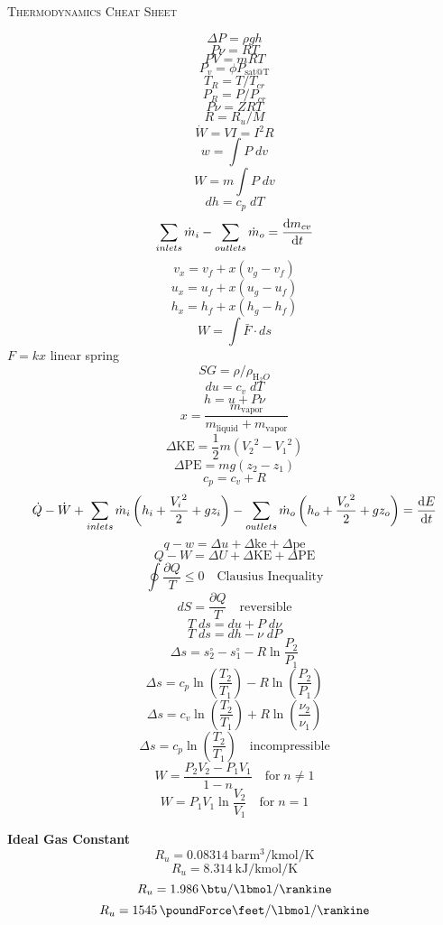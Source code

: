 \documentclass{article}
\begin{document}
\begin{center}
    \large\textsc{Thermodynamics Cheat Sheet} 
\end{center}

\begin{multicols}{2}
\[\Delta P = \rho gh\]
\[P \nu = R T\]
\[PV=mRT\]
\[P_v = \phi P_{\text{sat@T}}  \]
\[ T_R = T / T_{cr} \]
\[P_R = P/P_{cr}  \]
\[ P \nu = ZRT \]
\[ R=R_u / M \]
\[ \dot{W} = VI=I^2 R \]
\[ w=\int P \;dv \]
\[ W= m \int P \;dv \]
\[ dh=c_p \; dT \]
\[ \sum_{inlets} \dot{m}_i - \sum_{outlets} \dot{m}_o = \dv{m_{cv}}{t} \]
\[ v_x = v_f + x \left(v_g - v_f \right) \]
\[ u_x = u_f + x \left(u_g - u_f \right) \]
\[ h_x = h_f + x \left(h_g - h_f \right) \]
\[W=\int \bar{F} \cdot ds \]
\(F=kx  \) linear spring
\[ SG=\rho / \rho_{\text{H}_2 O} \]
\[ du= c_v \;dT \]
\[ h=u+ P\nu \]
\[ x=\frac{m_{\text{vapor}}}{m_{\text{liquid}}+m_{\text{vapor}}} \]
\[\Delta \text{KE} = \frac{1}{2}  m \left( {V_2}^2 -{V_1}^2  \right)  \]
\[\Delta \text{PE} =   mg \left( {z_2} -{z_1}  \right)  \]
\[ c_p = c_v + R \]
\[ \dot{Q} - \dot{W} + \sum_{inlets} \dot{m}_i \left( h_i + \frac{{V_i}^2}{2}+gz_i \right)  - \sum_{outlets} \dot{m}_o \left( h_o + \frac{{V_o}^2}{2}+gz_o \right) = \dv{E}{t} \]
\[ q-w=\Delta u + \Delta\text{ke} + \Delta\text{pe} \]
\[ Q-W=\Delta U + \Delta\text{KE} + \Delta\text{PE} \]
\[ \oint \frac{\partial Q }{T} \leq 0 \quad \text{Clausius Inequality}  \]
\[ dS= \frac{\partial Q}{T} \quad\text{reversible}  \]
\[ T\; ds=du+P\;d\nu \]
\[ T\;ds = dh - \nu \;dP \]
\[ \Delta s = s_2^{\circ} - s_1^{\circ} -R \ln \frac{P_2}{P_1} \]
\[ \Delta s = c_p \ln \left( \frac{T_2}{T_1} \right) - R \ln \left( \frac{P_2}{P_1} \right) \]
\[ \Delta s = c_v \ln \left( \frac{T_2}{T_1} \right) + R \ln \left( \frac{\nu_2}{\nu_1} \right) \]
\[ \Delta s = c_p \ln \left( \frac{T_2}{T_1} \right) \quad\text{incompressible} \]
\[ W = \frac{P_2 V_2 - P_1 V_1}{1 - n}\quad\text{for}\;n \neq 1  \]
\[ W = P_1 V_1 \ln \frac{V_2}{V_1}\quad\text{for}\;n = 1  \]

\end{multicols}

\textbf{Ideal Gas Constant}
\[ R_u = \SI{0.08314}{\bar\meter\cubed\per\kmol\per\kelvin} \]
\[ R_u = \SI{8.314}{\kilo\joule\per\kmol\per\kelvin} \]
\[ R_u = \SI{1.986}{\btu\per\lbmol\per\rankine} \]
\[ R_u = \SI{1545}{\poundForce\feet\per\lbmol\per\rankine} \]
\end{document}
